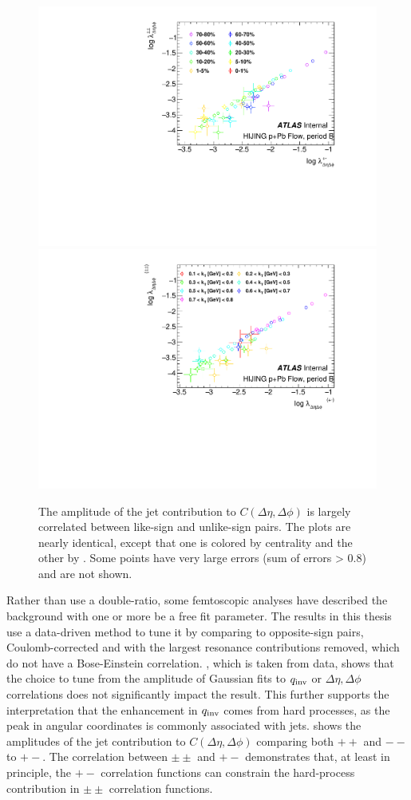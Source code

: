 \begin{figure}[t]
\centering
\includegraphics[width=.49\linewidth]{ang_lambda_opp_vs_same_MC.pdf}
\includegraphics[width=.49\linewidth]{ang_lambda_kt_opp_vs_same_MC.pdf}
\caption{The amplitude of the jet contribution to $C(\Delta\eta, \Delta\phi)$ is largely correlated between like-sign and unlike-sign pairs. The plots are nearly identical, except that one is colored by centrality and the other by \kt. Some points have very large errors (sum of errors > 0.8) and are not shown.}
\label{fig:background_ang_same_vs_opp_mc}
\end{figure}

Rather than use a double-ratio, some femtoscopic analyses have described the background with one or more be a free fit parameter.
The results in this thesis use a data-driven method to tune it by comparing to opposite-sign pairs, Coulomb-corrected and with the largest resonance contributions removed, which do not have a Bose-Einstein correlation.
, which is taken from data, shows that the choice to tune from the amplitude of Gaussian fits to $q_{\mathrm{inv}}$ or $\Delta\eta, \Delta\phi$ correlations does not significantly impact the result.
This further supports the interpretation that the enhancement in $q_{\mathrm{inv}}$ comes from hard processes, as the peak in angular coordinates is commonly associated with jets.
 shows the amplitudes of the jet contribution to $C(\Delta\eta, \Delta\phi)$ comparing both $++$ and $--$ to $+-$.
The correlation between $\pm\pm$ and $+-$ demonstrates that, at least in principle, the $+-$ correlation functions can constrain the hard-process contribution in $\pm\pm$ correlation functions.

